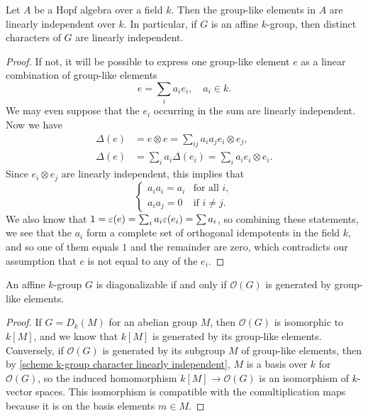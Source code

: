 \begin{lemma}\label{scheme k-group character linearly independent}
Let $A$ be a Hopf algebra over a field $k$. Then the group-like elements in $A$ are linearly independent over $k$. In particular, if $G$ is an affine $k$-group, then distinct characters of $G$ are linearly independent.
\end{lemma}
\begin{proof}
If not, it will be possible to express one group-like element $e$ as a linear combination of group-like elements
\[e=\sum_ia_ie_i,\quad a_i\in k.\]
We may even suppose that the $e_i$ occurring in the sum are linearly independent. Now we have
\begin{align*}
\Delta(e)&=e\otimes e=\sum_{ij}a_ia_je_i\otimes e_j,\\
\Delta(e)&=\sum_ia_i\Delta(e_i)=\sum_ia_ie_i\otimes e_i.
\end{align*}
Since $e_i\otimes e_j$ are linearly independent, this implies that
\[\begin{cases*}
a_ia_i=a_i&\text{for all $i$},\\
a_ia_j=0&\text{if $i\neq j$}.
\end{cases*}\]
We also know that $1=\varepsilon(e)=\sum_ia_i\varepsilon(e_i)=\sum a_i$, so combining these statements, we see that the $a_i$ form a complete set of orthogonal idempotents in the field $k$, and so one of them equals $1$ and the remainder are zero, which contradicts our assumption that $e$ is not equal to any of the $e_i$.
\end{proof}

\begin{proposition}\label{scheme k-group diagonalizable iff group-like element}
An affine $k$-group $G$ is diagonalizable if and only if $\mathscr{O}(G)$ is generated by group-like elements.
\end{proposition}
\begin{proof}
If $G=D_k(M)$ for an abelian group $M$, then $\mathscr{O}(G)$ is isomorphic to $k[M]$, and we know that $k[M]$ is generated by its group-like elements. Conversely, if $\mathscr{O}(G)$ is generated by its subgroup $M$ of group-like elements, then by \cref{scheme k-group character linearly independent}, $M$ is a basis over $k$ for $\mathscr{O}(G)$, so the induced homomorphism $k[M]\to\mathscr{O}(G)$ is an isomorphism of $k$-vector spaces. This isomorphism is compatible with the comultiplication maps because it is on the basis elements $m\in M$.
\end{proof}

